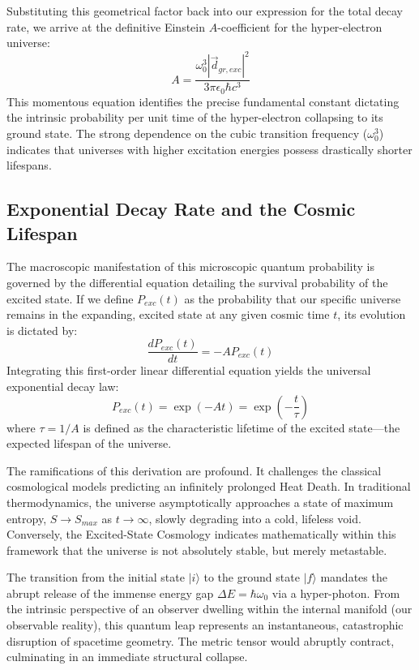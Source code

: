 Substituting this geometrical factor back into our expression for the total decay rate, we arrive at the definitive Einstein $A$-coefficient for the hyper-electron universe:
\begin{equation}
    A = \frac{\omega_0^3 |\vec{d}_{gr, exc}|^2}{3 \pi \epsilon_0 \hbar c^3}
\end{equation}
This momentous equation identifies the precise fundamental constant dictating the intrinsic probability per unit time of the hyper-electron collapsing to its ground state. The strong dependence on the cubic transition frequency ($\omega_0^3$) indicates that universes with higher excitation energies possess drastically shorter lifespans.

\subsection{Exponential Decay Rate and the Cosmic Lifespan}
The macroscopic manifestation of this microscopic quantum probability is governed by the differential equation detailing the survival probability of the excited state. If we define $P_{exc}(t)$ as the probability that our specific universe remains in the expanding, excited state at any given cosmic time $t$, its evolution is dictated by:
\begin{equation}
    \frac{dP_{exc}(t)}{dt} = -A P_{exc}(t)
\end{equation}
Integrating this first-order linear differential equation yields the universal exponential decay law:
\begin{equation}
    P_{exc}(t) = \exp(-A t) = \exp\left(-\frac{t}{\tau}\right)
\end{equation}
where $\tau = 1/A$ is defined as the characteristic lifetime of the excited state---the expected lifespan of the universe. 

The ramifications of this derivation are profound. It challenges the classical cosmological models predicting an infinitely prolonged Heat Death. In traditional thermodynamics, the universe asymptotically approaches a state of maximum entropy, $S \to S_{max}$ as $t \to \infty$, slowly degrading into a cold, lifeless void. Conversely, the Excited-State Cosmology indicates mathematically within this framework that the universe is not absolutely stable, but merely metastable.

The transition from the initial state $|i\rangle$ to the ground state $|f\rangle$ mandates the abrupt release of the immense energy gap $\Delta E = \hbar \omega_0$ via a hyper-photon. From the intrinsic perspective of an observer dwelling within the internal manifold (our observable reality), this quantum leap represents an instantaneous, catastrophic disruption of spacetime geometry. The metric tensor would abruptly contract, culminating in an immediate structural collapse. 

